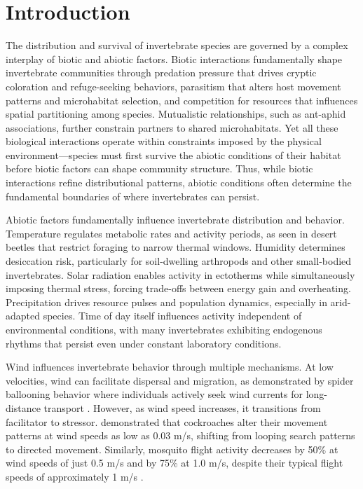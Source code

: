 \usepackage{hyperref}
\usepackage{longtable}

\chapter{Introduction}
\label{ch:introduction}


The distribution and survival of invertebrate species are governed by a complex interplay of biotic and abiotic factors. Biotic interactions fundamentally shape invertebrate communities through predation pressure that drives cryptic coloration and refuge-seeking behaviors, parasitism that alters host movement patterns and microhabitat selection, and competition for resources that influences spatial partitioning among species. Mutualistic relationships, such as ant-aphid associations, further constrain partners to shared microhabitats.
Yet all these biological interactions operate within constraints imposed by the physical environment—species must first survive the abiotic conditions of their habitat before biotic factors can shape community structure. Thus, while biotic interactions refine distributional patterns, abiotic conditions often determine the fundamental boundaries of where invertebrates can persist.

Abiotic factors fundamentally influence invertebrate distribution and behavior. Temperature regulates metabolic rates and activity periods, as seen in desert beetles that restrict foraging to narrow thermal windows. Humidity determines desiccation risk, particularly for soil-dwelling arthropods and other small-bodied invertebrates. Solar radiation enables activity in ectotherms while simultaneously imposing thermal stress, forcing trade-offs between energy gain and overheating. Precipitation drives resource pulses and population dynamics, especially in arid-adapted species. Time of day itself influences activity independent of environmental conditions, with many invertebrates exhibiting endogenous rhythms that persist even under constant laboratory conditions.


Wind influences invertebrate behavior through multiple mechanisms. At low velocities, wind can facilitate dispersal and migration, as demonstrated by spider ballooning behavior where individuals actively seek wind currents for long-distance transport \citep{bonteHeritabilitySpiderBallooning2007}. However, as wind speed increases, it transitions from facilitator to stressor. \citet{bellSearchAnemotacticOrientation1979} demonstrated that cockroaches alter their movement patterns at wind speeds as low as 0.03 m/s, shifting from looping search patterns to directed movement. Similarly, mosquito flight activity decreases by 50\% at wind speeds of just 0.5 m/s and by 75\% at 1.0 m/s, despite their typical flight speeds of approximately 1 m/s \citep{bidlingmayerEffectWindVelocity1995}.

